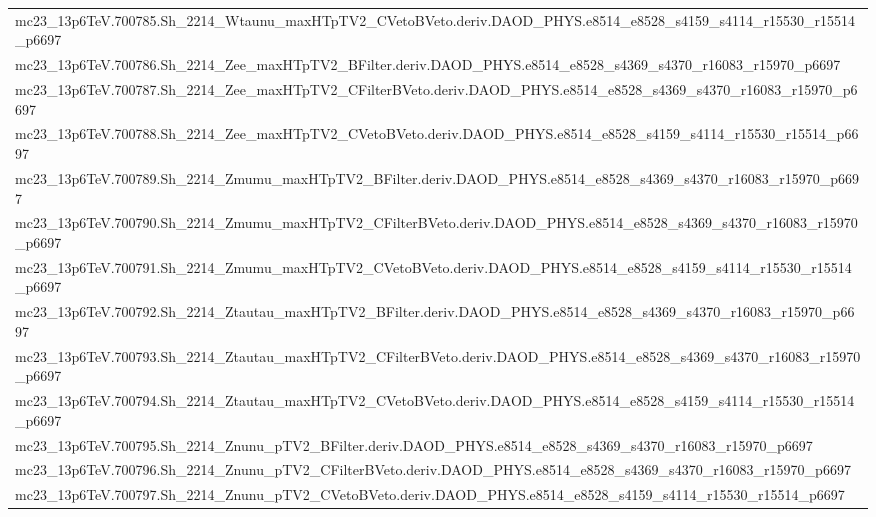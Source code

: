 \begin{table}[ht]
\begin{tabular}{l}
mc23\_13p6TeV.700785.Sh\_2214\_Wtaunu\_maxHTpTV2\_CVetoBVeto.deriv.DAOD\_PHYS.e8514\_e8528\_s4159\_s4114\_r15530\_r15514\_p6697 \\
mc23\_13p6TeV.700786.Sh\_2214\_Zee\_maxHTpTV2\_BFilter.deriv.DAOD\_PHYS.e8514\_e8528\_s4369\_s4370\_r16083\_r15970\_p6697 \\
mc23\_13p6TeV.700787.Sh\_2214\_Zee\_maxHTpTV2\_CFilterBVeto.deriv.DAOD\_PHYS.e8514\_e8528\_s4369\_s4370\_r16083\_r15970\_p6697 \\
mc23\_13p6TeV.700788.Sh\_2214\_Zee\_maxHTpTV2\_CVetoBVeto.deriv.DAOD\_PHYS.e8514\_e8528\_s4159\_s4114\_r15530\_r15514\_p6697 \\
mc23\_13p6TeV.700789.Sh\_2214\_Zmumu\_maxHTpTV2\_BFilter.deriv.DAOD\_PHYS.e8514\_e8528\_s4369\_s4370\_r16083\_r15970\_p6697 \\
mc23\_13p6TeV.700790.Sh\_2214\_Zmumu\_maxHTpTV2\_CFilterBVeto.deriv.DAOD\_PHYS.e8514\_e8528\_s4369\_s4370\_r16083\_r15970\_p6697 \\
mc23\_13p6TeV.700791.Sh\_2214\_Zmumu\_maxHTpTV2\_CVetoBVeto.deriv.DAOD\_PHYS.e8514\_e8528\_s4159\_s4114\_r15530\_r15514\_p6697 \\
mc23\_13p6TeV.700792.Sh\_2214\_Ztautau\_maxHTpTV2\_BFilter.deriv.DAOD\_PHYS.e8514\_e8528\_s4369\_s4370\_r16083\_r15970\_p6697 \\
mc23\_13p6TeV.700793.Sh\_2214\_Ztautau\_maxHTpTV2\_CFilterBVeto.deriv.DAOD\_PHYS.e8514\_e8528\_s4369\_s4370\_r16083\_r15970\_p6697 \\
mc23\_13p6TeV.700794.Sh\_2214\_Ztautau\_maxHTpTV2\_CVetoBVeto.deriv.DAOD\_PHYS.e8514\_e8528\_s4159\_s4114\_r15530\_r15514\_p6697 \\
mc23\_13p6TeV.700795.Sh\_2214\_Znunu\_pTV2\_BFilter.deriv.DAOD\_PHYS.e8514\_e8528\_s4369\_s4370\_r16083\_r15970\_p6697 \\
mc23\_13p6TeV.700796.Sh\_2214\_Znunu\_pTV2\_CFilterBVeto.deriv.DAOD\_PHYS.e8514\_e8528\_s4369\_s4370\_r16083\_r15970\_p6697 \\
mc23\_13p6TeV.700797.Sh\_2214\_Znunu\_pTV2\_CVetoBVeto.deriv.DAOD\_PHYS.e8514\_e8528\_s4159\_s4114\_r15530\_r15514\_p6697 \\
\bottomrule
\end{tabular}
\end{table}


